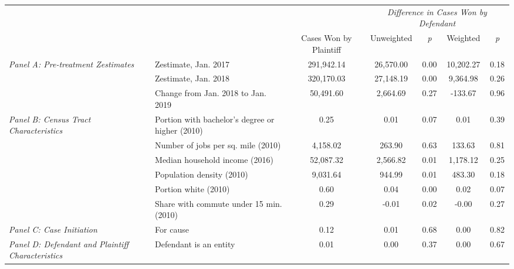 \begin{tabular}{llccccc}
\toprule
 &  & \textit{} & \multicolumn{4}{c}{\textit{Difference in Cases Won by Defendant}} \\
 &  & Cases Won by Plaintiff & Unweighted & \emph{p} & Weighted & \emph{p} \\
\midrule
\multirow[c]{3}{3cm}{\textit{Panel A: Pre-treatment Zestimates}} & Zestimate, Jan. 2017 & 291,942.14 & 26,570.00 & 0.00 & 10,202.27 & 0.18 \\
 & Zestimate, Jan. 2018 & 320,170.03 & 27,148.19 & 0.00 & 9,364.98 & 0.26 \\
 & Change from Jan. 2018 to Jan. 2019 & 50,491.60 & 2,664.69 & 0.27 & -133.67 & 0.96 \\
\cline{1-7}
\multirow[c]{6}{3cm}{\textit{Panel B: Census Tract Characteristics}} & Portion with bachelor's degree or higher (2010) & 0.25 & 0.01 & 0.07 & 0.01 & 0.39 \\
 & Number of jobs per sq. mile (2010) & 4,158.02 & 263.90 & 0.63 & 133.63 & 0.81 \\
 & Median household income (2016) & 52,087.32 & 2,566.82 & 0.01 & 1,178.12 & 0.25 \\
 & Population density (2010) & 9,031.64 & 944.99 & 0.01 & 483.30 & 0.18 \\
 & Portion white (2010) & 0.60 & 0.04 & 0.00 & 0.02 & 0.07 \\
 & Share with commute under 15 min. (2010) & 0.29 & -0.01 & 0.02 & -0.00 & 0.27 \\
\cline{1-7}
\textit{Panel C: Case Initiation} & For cause & 0.12 & 0.01 & 0.68 & 0.00 & 0.82 \\
\cline{1-7}
\textit{Panel D: Defendant and Plaintiff Characteristics} & Defendant is an entity & 0.01 & 0.00 & 0.37 & 0.00 & 0.67 \\
\cline{1-7}
\bottomrule
\end{tabular}
